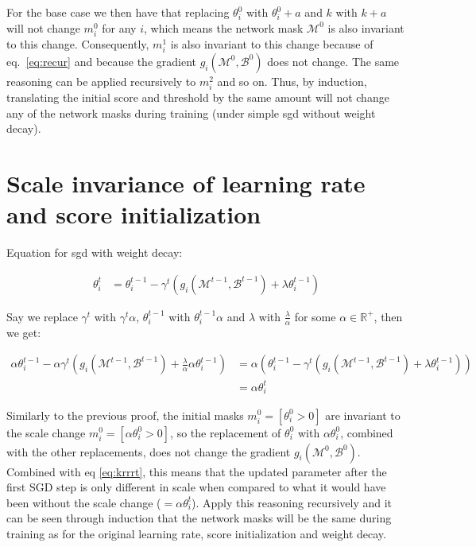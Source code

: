 \documentclass[12pt]{report}
\begin{document}
    For the base case we then have that replacing $\theta_i^0$ with $\theta_i^0 + a$ and $k$ with $k+a$ will not change $m_i^0$ for any $i$, which means the network mask $\mathcal{M}^0$ is also invariant to this change.
    Consequently, $m_i^1$ is also invariant to this change because of eq.~\ref{eq:recur} and because the gradient $g_i(\mathcal{M}^0, \mathcal{B}^0)$ does not change. The same reasoning can be applied recursively to $m_i^2$ and so on. Thus, by induction, translating the initial score and threshold by the same amount will not change any of the network masks during training (under simple sgd without weight decay).

    \section{Scale invariance of learning rate and score initialization}

    Equation for sgd with weight decay:

    \begin{align}
        \theta_i^t &= \theta_i^{t-1} - \gamma^t \left( g_i(\mathcal{M}^{t-1}, \mathcal{B}^{t-1}) + \lambda \theta_i^{t-1} \right)
    \end{align}

    Say we replace $\gamma^t$ with $\gamma^t \alpha$, $\theta_i^{t-1}$ with $\theta_i^{t-1} \alpha$ and $\lambda$ with $\frac{\lambda}{\alpha}$ for some $\alpha \in \mathbb{R}^+$, then we get:

    \begin{align}
        \alpha\theta_i^{t-1} - \alpha\gamma^t \left( g_i(\mathcal{M}^{t-1}, \mathcal{B}^{t-1}) + \frac{\lambda}{\alpha} \alpha\theta_i^{t-1} \right) &= \alpha \left(\theta_i^{t-1} - \gamma^t \left( g_i(\mathcal{M}^{t-1}, \mathcal{B}^{t-1}) + \lambda \theta_i^{t-1} \right)\right)\\
        &= \alpha\theta_i^{t}\label{eq:krrrt}
    \end{align}

    Similarly to the previous proof, the initial masks $m_i^0 = [\theta_i^0 > 0]$ are invariant to the scale change $m_i^0 = [\alpha\theta_i^0 > 0]$, so the replacement of $\theta_i^0$ with $\alpha\theta_i^0$, combined with the other replacements, does not change the gradient $g_i(\mathcal{M}^0, \mathcal{B}^0)$.  Combined with eq \ref{eq:krrrt}, this means that the updated parameter after the first SGD step is only different in scale when compared to what it would have been without the scale change ($=\alpha\theta_i^t$). Apply this reasoning recursively and it can be seen through induction that the network masks will be the same during training as for the original learning rate, score initialization and weight decay.
\end{document}
